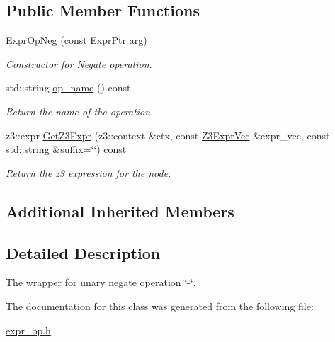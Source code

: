 \subsection*{Public Member Functions}
\begin{DoxyCompactItemize}
\item 
\mbox{\label{classilang_1_1_expr_op_neg_a6ab1bd2ddfcf3a022e6e26e8a55a4c77}} 
\mbox{\hyperlink{classilang_1_1_expr_op_neg_a6ab1bd2ddfcf3a022e6e26e8a55a4c77}{Expr\+Op\+Neg}} (const \mbox{\hyperlink{classilang_1_1_expr_a85952b6a34620c4c8cab6bac9c9fdf8c}{Expr\+Ptr}} \mbox{\hyperlink{classilang_1_1_expr_a754c28cd350d28c7bdc8fffe7fe22ec2}{arg}})
\begin{DoxyCompactList}\small\item\em Constructor for Negate operation. \end{DoxyCompactList}\item 
\mbox{\label{classilang_1_1_expr_op_neg_a2f4556ed756b2c8865229f6e5e6d2214}} 
std\+::string \mbox{\hyperlink{classilang_1_1_expr_op_neg_a2f4556ed756b2c8865229f6e5e6d2214}{op\+\_\+name}} () const
\begin{DoxyCompactList}\small\item\em Return the name of the operation. \end{DoxyCompactList}\item 
\mbox{\label{classilang_1_1_expr_op_neg_a6cbe0829198771339149ffbb0a87a4e4}} 
z3\+::expr \mbox{\hyperlink{classilang_1_1_expr_op_neg_a6cbe0829198771339149ffbb0a87a4e4}{Get\+Z3\+Expr}} (z3\+::context \&ctx, const \mbox{\hyperlink{namespaceilang_adc4eee919aa24fff882d03a48d733c19}{Z3\+Expr\+Vec}} \&expr\+\_\+vec, const std\+::string \&suffix=\char`\"{}\char`\"{}) const
\begin{DoxyCompactList}\small\item\em Return the z3 expression for the node. \end{DoxyCompactList}\end{DoxyCompactItemize}
\subsection*{Additional Inherited Members}


\subsection{Detailed Description}
The wrapper for unary negate operation \char`\"{}-\/\char`\"{}. 

The documentation for this class was generated from the following file\+:\begin{DoxyCompactItemize}
\item 
\mbox{\hyperlink{expr__op_8h}{expr\+\_\+op.\+h}}\end{DoxyCompactItemize}
